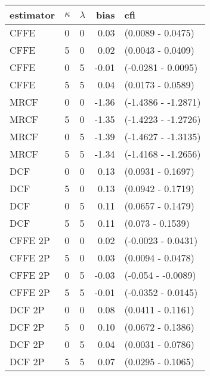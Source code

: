 \begin{tabular}{lllrl}
  \hline
estimator & $\kappa$ & $\lambda$ & bias & cfi \\ 
  \hline
CFFE  & 0 & 0 & 0.03 & (0.0089 - 0.0475) \\ 
  CFFE  & 5 & 0 & 0.02 & (0.0043 - 0.0409) \\ 
  CFFE  & 0 & 5 & -0.01 & (-0.0281 - 0.0095) \\ 
  CFFE  & 5 & 5 & 0.04 & (0.0173 - 0.0589) \\ 
  MRCF  & 0 & 0 & -1.36 & (-1.4386 - -1.2871) \\ 
  MRCF  & 5 & 0 & -1.35 & (-1.4223 - -1.2726) \\ 
  MRCF  & 0 & 5 & -1.39 & (-1.4627 - -1.3135) \\ 
  MRCF  & 5 & 5 & -1.34 & (-1.4168 - -1.2656) \\ 
  DCF  & 0 & 0 & 0.13 & (0.0931 - 0.1697) \\ 
  DCF  & 5 & 0 & 0.13 & (0.0942 - 0.1719) \\ 
  DCF  & 0 & 5 & 0.11 & (0.0657 - 0.1479) \\ 
  DCF  & 5 & 5 & 0.11 & (0.073 - 0.1539) \\ 
  CFFE 2P  & 0 & 0 & 0.02 & (-0.0023 - 0.0431) \\ 
  CFFE 2P  & 5 & 0 & 0.03 & (0.0094 - 0.0478) \\ 
  CFFE 2P  & 0 & 5 & -0.03 & (-0.054 - -0.0089) \\ 
  CFFE 2P  & 5 & 5 & -0.01 & (-0.0352 - 0.0145) \\ 
  DCF 2P  & 0 & 0 & 0.08 & (0.0411 - 0.1161) \\ 
  DCF 2P  & 5 & 0 & 0.10 & (0.0672 - 0.1386) \\ 
  DCF 2P  & 0 & 5 & 0.04 & (0.0031 - 0.0786) \\ 
  DCF 2P  & 5 & 5 & 0.07 & (0.0295 - 0.1065) \\ 
   \hline
\end{tabular}
